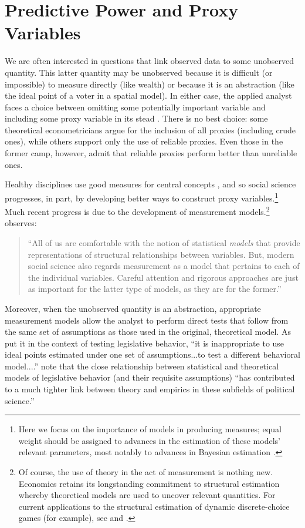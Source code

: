 \section{Predictive Power and Proxy Variables}

We are often interested in questions that link observed data to some unobserved quantity.
This latter quantity may be unobserved because it is difficult (or impossible) to measure directly (like wealth) or because it is an abstraction (like the ideal point of a voter in a spatial model).
In either case, the applied analyst faces a choice between omitting some potentially important variable and including some proxy variable in its stead \citep{stahlecker1993}.
There is no best choice: some theoretical econometricians \citep[e.g.][]{mccallum1972} argue for the inclusion of all proxies (including crude ones), while others \citep[e.g.][]{maddala1977} support only the use of reliable proxies.
Even those in the former camp, however, admit that reliable proxies perform better than unreliable ones.

Healthy disciplines use good measures for central concepts \citep{kuhn1977}, and so social science progresses, in part, by developing better ways to construct proxy variables.\footnote{Here we focus on the importance of models in producing measures; equal weight should be assigned to advances in the estimation of these models' relevant parameters, most notably to advances in Bayesian estimation \citep{jackman2001,martin2002,clinton2004,bafumi2005}.}
Much recent progress is due to the development of measurement models.\footnote{Of course, the use of theory in the act of measurement is nothing new.
  Economics retains its longstanding commitment to structural estimation whereby theoretical models are used to uncover relevant quantities.
  For current applications to the structural estimation of dynamic discrete-choice games (for example), see \citet{su2012} and \citet{egesdal2013}.} \citet[2]{jacoby2014} observes:
\begin{quote}
  ``All of us are comfortable with the notion of statistical \emph{models} that provide representations of structural relationships between variables.  But, modern social science also regards measurement as a model that pertains to each of the individual variables.  Careful attention and rigorous approaches are just as important for the latter type of models, as they are for the former.''
\end{quote}
Moreover, when the unobserved quantity is an abstraction, appropriate measurement models allow the analyst to perform direct tests that follow from the same set of assumptions as those used in the original, theoretical model.
As \citet[355]{clinton2004} put it in the context of testing legislative behavior, ``it is inappropriate to use ideal points estimated under one set of assumptions...to test a different behavioral model....''  \citet[530]{shor2011} note that the close relationship between statistical and theoretical models of legislative behavior (and their requisite assumptions) ``has contributed to a much tighter link between theory and empirics in these subfields of political science.''

